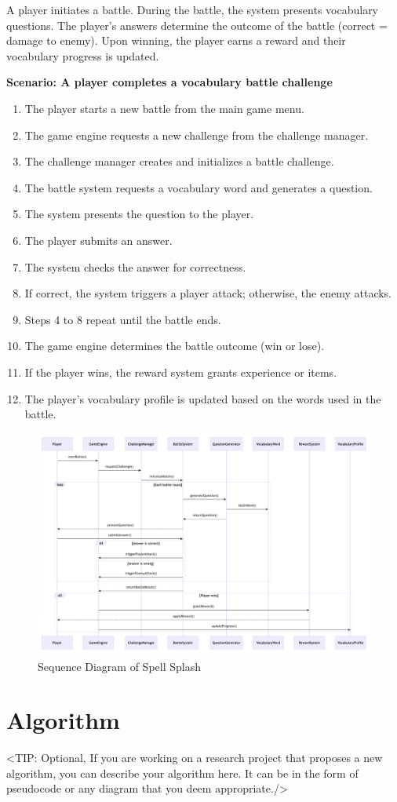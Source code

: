 A player initiates a battle. During the battle, the system presents vocabulary questions. 
The player's answers determine the outcome of the battle (correct = damage to enemy). 
Upon winning, the player earns a reward and their vocabulary progress is updated.

\vspace{1em}

\textbf{Scenario: A player completes a vocabulary battle challenge}
\begin{enumerate}
    \item The player starts a new battle from the main game menu.
    \item The game engine requests a new challenge from the challenge manager.
    \item The challenge manager creates and initializes a battle challenge.
    \item The battle system requests a vocabulary word and generates a question.
    \item The system presents the question to the player.
    \item The player submits an answer.
    \item The system checks the answer for correctness.
    \item If correct, the system triggers a player attack; otherwise, the enemy attacks.
    \item Steps 4 to 8 repeat until the battle ends.
    \item The game engine determines the battle outcome (win or lose).
    \item If the player wins, the reward system grants experience or items.
    \item The player's vocabulary profile is updated based on the words used in the battle.
\end{enumerate}

\clearpage

\begin{figure}[H]
    \centering
    \includegraphics[width=1\textwidth]{assets/ku/sequence_diagram.png}
    \caption{Sequence Diagram of Spell Splash}
    \label{fig:sequence-diagram}
\end{figure}

\clearpage

\section{Algorithm}
\label{section:algorithm}
<TIP: Optional, If you are working on a research project that proposes a new
algorithm, you can describe your algorithm here. It can be in the form of
pseudocode or any diagram that you deem appropriate./>